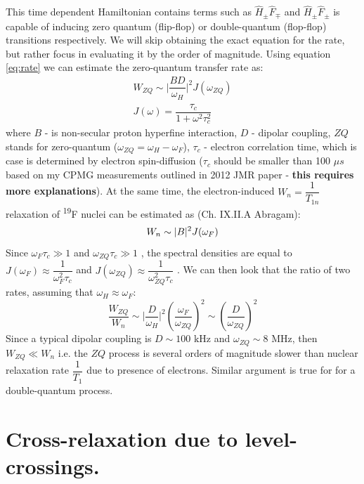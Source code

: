 \documentclass[a4paper, 12pt]{article}
\begin{document}
This time dependent Hamiltonian contains terms such as $\hat{H}_{\pm} \hat{F}_{\mp}$ and $\hat{H}_{\pm} \hat{F}_{\pm}$ is capable of inducing zero quantum (flip-flop) or double-quantum (flop-flop) transitions respectively. We will skip obtaining the exact equation for the rate, but rather focus in evaluating it by the order of magnitude. Using equation \ref{eq:rate} we can estimate the zero-quantum transfer rate as:
\begin{equation}
\begin{array}{cc}
W_{ZQ}  \sim \vert \dfrac{B D}{\omega_H} \vert ^2 J(\omega_{ZQ}) \\
J(\omega) = \dfrac{\tau_c}{1+\omega^2\tau_c^2}
\end{array}
\end{equation}
where $B$ - is non-secular proton hyperfine interaction, $D$ - dipolar coupling, $ZQ$ stands for zero-quantum ($\omega_{ZQ} = \omega_H - \omega_F$), $\tau_c$ - electron correlation time, which is case is determined by electron spin-diffusion ($\tau_c$ should be smaller than 100 $\mu s$ based on my CPMG measurements outlined in 2012 JMR paper - \textbf{this requires more explanations}). At the same time, the electron-induced $W_n = \dfrac{1}{T_{1n}}$ relaxation of \textsuperscript{19}F nuclei can be estimated as (Ch. IX.II.A Abragam):
\begin{equation}
W_{n}  \sim \vert B \vert ^2 J(\omega_F) \\
\end{equation}
Since $\omega_F \tau_c \gg 1$ and $\omega_{ZQ} \tau_c \gg 1$ ,  the spectral densities are equal to $J(\omega_F) \approx \dfrac{1}{\omega_F^2 \tau_c}$ and $J(\omega_{ZQ}) \approx \dfrac{1}{\omega_{ZQ}^2 \tau_c}$ . We can then look that the ratio of two rates, assuming that $\omega_H \approx \omega_F$:
\begin{equation}
\dfrac{W_{ZQ}}{W_n} \sim \vert \dfrac{D}{\omega_H} \vert^2 (\dfrac{\omega_F}{\omega_{ZQ}})^2 \sim (\dfrac{D}{\omega_{ZQ}})^2
\end{equation}
Since a typical dipolar coupling is $D \sim 100 \text{ kHz}$ and $\omega_{ZQ} \sim 8 \text{ MHz}$, then $W_{ZQ} \ll W_n$ i.e. the $ZQ$ process is several orders of magnitude slower than nuclear relaxation rate $\dfrac{1}{T_1}$ due to presence of electrons. Similar argument is true for for a double-quantum process. 


\section{Cross-relaxation due to level-crossings.}
\end{document}
